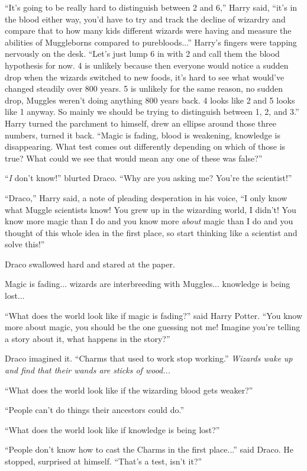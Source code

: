 ``It's going to be really hard to distinguish between 2 and 6,'' Harry said, ``it's in the blood either way, you'd have to try and track the decline of wizardry and compare that to how many kids different wizards were having and measure the abilities of Muggleborns compared to purebloods...'' Harry's fingers were tapping nervously on the desk. ``Let's just lump 6 in with 2 and call them the blood hypothesis for now. 4 is unlikely because then everyone would notice a sudden drop when the wizards switched to new foods, it's hard to see what would've changed steadily over 800 years. 5 is unlikely for the same reason, no sudden drop, Muggles weren't doing anything 800 years back. 4 looks like 2 and 5 looks like 1 anyway. So mainly we should be trying to distinguish between 1, 2, and 3.'' Harry turned the parchment to himself, drew an ellipse around those three numbers, turned it back. ``Magic is fading, blood is weakening, knowledge is disappearing. What test comes out differently depending on which of those is true? What could we see that would mean any one of these was false?''

``\emph{I} don't know!'' blurted Draco. ``Why are you asking me? You're the scientist!''

``Draco,'' Harry said, a note of pleading desperation in his voice, ``I only know what Muggle scientists know! You grew up in the wizarding world, I didn't! You know more magic than I do and you know more \emph{about} magic than I do and you thought of this whole idea in the first place, so start thinking like a scientist and solve this!''

Draco swallowed hard and stared at the paper.

Magic is fading... wizards are interbreeding with Muggles... knowledge is being lost...

``What does the world look like if magic is fading?'' said Harry Potter. ``You know more about magic, you should be the one guessing not me! Imagine you're telling a story about it, what happens in the story?''

Draco imagined it. ``Charms that used to work stop working.'' \emph{Wizards wake up and find that their wands are sticks of wood...}

``What does the world look like if the wizarding blood gets weaker?''

``People can't do things their ancestors could do.''

``What does the world look like if knowledge is being lost?''

``People don't know how to cast the Charms in the first place...'' said Draco. He stopped, surprised at himself. ``That's a test, isn't it?''

